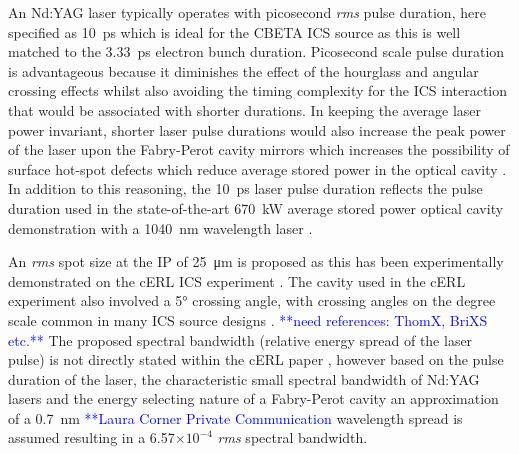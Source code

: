 \documentclass[../main.tex]{subfiles}
\begin{document}
An Nd:YAG laser typically operates with picosecond \textit{rms} pulse duration, here specified as 10~\si{\pico\second} which is ideal for the CBETA ICS source as this is well matched to the 3.33~\si{\pico\second} electron bunch duration. Picosecond scale pulse duration is advantageous because it diminishes the effect of the hourglass and angular crossing effects \cite{miyahara2008luminosity} whilst also avoiding the timing complexity for the ICS interaction that would be associated with shorter durations. In keeping the average laser power invariant, shorter laser pulse durations would also increase the peak power of the laser upon the Fabry-Perot cavity mirrors which increases the possibility of surface hot-spot defects which reduce average stored power in the optical cavity \cite{wang2020prior}. In addition to this reasoning, the 10~\si{\pico\second} laser pulse duration reflects the pulse duration used in the state-of-the-art 670~\si{\kilo\watt} average stored power optical cavity demonstration with a 1040~\si{\nano\meter} wavelength laser \cite{carstens2014megawatt}.     

An \textit{rms} spot size at the IP of 25~\si{\micro\meter} is proposed as this has been experimentally demonstrated on the cERL ICS experiment \cite{akagi2016narrow}. The cavity used in the cERL experiment also involved a 5\si{\degree} crossing angle, with crossing angles on the degree scale common in many ICS source designs \cite{}. \textcolor{blue}{**need references: ThomX, BriXS etc.**} The proposed spectral bandwidth (relative energy spread of the laser pulse) is not directly stated within the cERL paper \cite{akagi2016narrow}, however based on the pulse duration of the laser, the characteristic small spectral bandwidth of Nd:YAG lasers and the energy selecting nature of a Fabry-Perot cavity an approximation of a 0.7~\si{\nano\meter} \cite{} \textcolor{blue}{**Laura Corner Private Communication} wavelength spread is assumed resulting in a 6.57$\times 10^{-4}$ \textit{rms} spectral bandwidth.     
\end{document}
